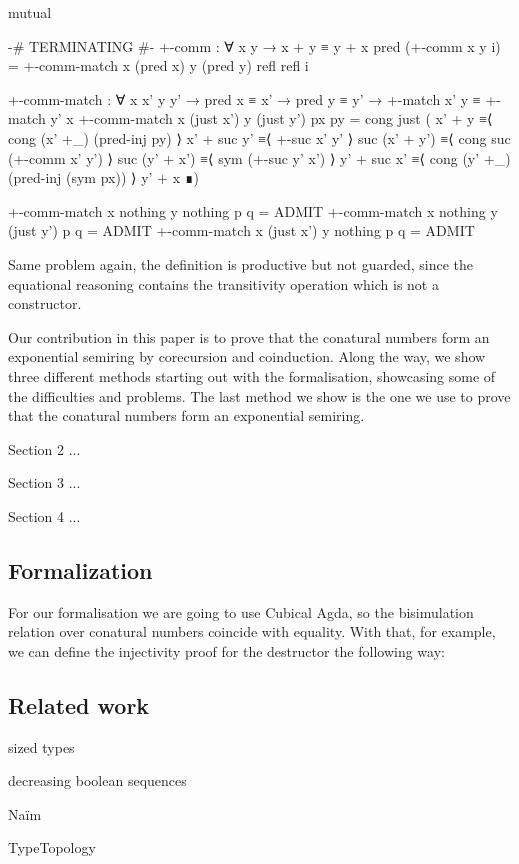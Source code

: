 \begin{code}[hide]
mutual
\end{code}
\begin{code}
  {-# TERMINATING #-}
  +-comm : ∀ x y → x + y ≡ y + x
  pred (+-comm x y i) =
    +-comm-match x (pred x) y (pred y) refl refl i

  +-comm-match :
    ∀ x x' y y' → pred x ≡ x' → pred y ≡ y' →
    +-match x' y ≡ +-match y' x
  +-comm-match x (just x') y (just y') px py =
    cong just
      ( x' + y         ≡⟨ cong (x' +_) (pred-inj py) ⟩
        x' + suc y'    ≡⟨ +-suc x' y' ⟩
        suc (x' + y')  ≡⟨ cong suc (+-comm x' y') ⟩
        suc (y' + x')  ≡⟨ sym (+-suc y' x') ⟩
        y' + suc x'    ≡⟨ cong (y' +_) (pred-inj (sym px)) ⟩
        y' + x         ∎)
\end{code}
\begin{code}[hide]
  +-comm-match x nothing y nothing p q = ADMIT
  +-comm-match x nothing y (just y') p q = ADMIT
  +-comm-match x (just x') y nothing p q = ADMIT
\end{code}

Same problem again, the definition is productive but not guarded, since the
equational reasoning contains the transitivity operation which is not a
constructor.

Our contribution in this paper is to prove that the conatural numbers form an
exponential semiring by corecursion and coinduction. Along the way, we show
three different methods starting out with the formalisation, showcasing some of
the difficulties and problems. The last method we show is the one we use to
prove that the conatural numbers form an exponential semiring.

Section 2 ...

Section 3 ...

Section 4 ...

\subsection{Formalization}

For our formalisation we are going to use Cubical Agda, so the bisimulation
relation over conatural numbers coincide with equality. With that, for example,
we can define the injectivity proof for the  destructor the
following way:

\subsection{Related work}

sized types

decreasing boolean sequences

Naïm

TypeTopology
